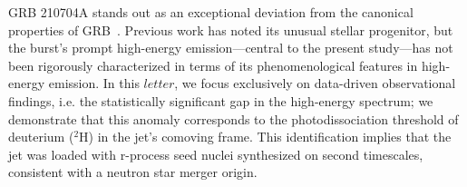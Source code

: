 \documentclass[linenumbers,twocolumn]{aastex631}
\begin{document}






GRB 210704A stands out as an exceptional deviation from the canonical properties of GRB~\citep{2021GCN.30380....1M,2023MNRAS.522.5204B}. Previous work has noted its unusual stellar progenitor, but the burst’s prompt high-energy emission—central to the present study—has not been rigorously characterized in terms of its phenomenological features in high-energy emission. In this $letter$, we focus exclusively on data-driven observational findings, i.e. the statistically significant gap in the high-energy spectrum; we demonstrate that this anomaly corresponds to the photodissociation threshold of deuterium ($^2$H) in the jet's comoving frame. This identification implies that the jet was loaded with r-process seed nuclei synthesized on second timescales, consistent with a neutron star merger origin.
\end{document}
